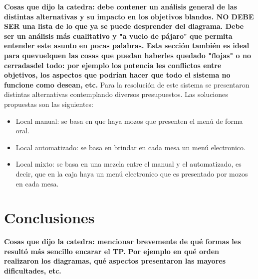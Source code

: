 \documentclass[a4paper,10pt]{article}
\begin{document}
\textbf{Cosas que dijo la catedra: debe contener un análisis general de las distintas alternativas y su impacto en los objetivos blandos. NO DEBE SER una lista de lo que ya se puede desprender del diagrama. Debe ser un análisis más cualitativo y "a vuelo de pájaro" que permita entender este asunto en pocas palabras. Esta sección también es ideal para quevuelquen las cosas que puedan haberles quedado "flojas" o no cerradasdel todo: por ejemplo los potencia les conflictos entre objetivos, los aspectos que podrían hacer que todo el sistema no funcione como desean, etc.}
Para la resoluci\'on de este sistema se presentaron distintas alternativas contemplando diversos presupuestos. Las soluciones propuestas son las siguientes:
\begin{itemize}
\item Local manual: se basa en que haya mozos que presenten el men\'u de forma oral.
\item Local automatizado: se basa en brindar en cada mesa un men\'u electronico.
\item Local mixto: se basa en una mezcla entre el manual y el automatizado, es decir, que en la caja haya un men\'u electronico que es presentado por mozos en cada mesa.
\end{itemize}


\newpage
\section*{Conclusiones}

\textbf{Cosas que dijo la catedra: mencionar brevemente de qué formas les resultó más sencillo encarar el TP. Por ejemplo en qué orden realizaron los diagramas, qué aspectos presentaron las mayores dificultades, etc.}
\end{document}
